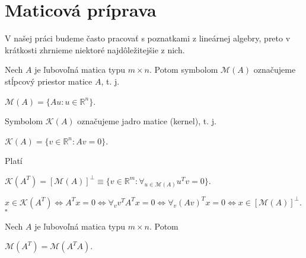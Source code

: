\section{Maticová príprava}
\label{matrix algebra}

V našej práci budeme často pracovať s poznatkami z lineárnej algebry, preto v krátkosti zhrnieme niektoré najdôležitejšie z nich.

\begin{defin}
Nech $A$ je ľubovoľná matica typu $m \times n$. Potom symbolom $\mathcal{M}(A)$ označujeme stĺpcový priestor matice $A$, t. j.
\begin{center}
$
\mathcal{M}(A) = \{ Au : u \in \mathbb{R}^n \}
$.
\end{center}
Symbolom $\mathcal{K}(A)$ označujeme jadro matice (kernel), t. j.
\begin{center}
$
\mathcal{K}(A) = \{ v \in \mathbb{R}^n : Av = 0 \}
$.
\end{center}
\end{defin}

\begin{lema}
Platí
\begin{center}
$
\mathcal{K}(A^T) = [\mathcal{M}(A)]^{\perp} \equiv \{ v \in \mathbb{R}^m : {\forall}_{u \in \mathcal{M}(A)} u^T v = 0 \}
$.
\end{center}
\end{lema}

\begin{dokaz}


\begin{center}
$
x \in \mathcal{K}(A^T) \Leftrightarrow A^T x = 0 \Leftrightarrow {\forall}_v v^T A^T x = 0 \Leftrightarrow {\forall}_v (Av)^Tx = 0 \Leftrightarrow x \in [\mathcal{M}(A)]^{\perp}
$. $\square$
\end{center}
\end{dokaz}

\begin{lema}
\label{o stlpcovych priestoroch}
Nech $A$ je ľubovoľná matica typu $m \times n$. Potom
\begin{center}
$\mathcal{M}(A^T) = \mathcal{M}(A^T A)$.
\end{center}
\end{lema}

